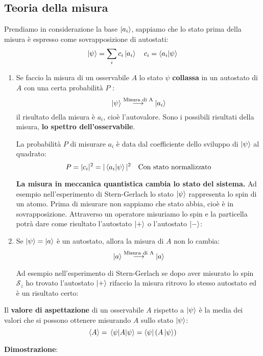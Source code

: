 \documentclass[a4paper]{article}
\begin{document}
\subsection{Teoria della misura}
Prendiamo in considerazione la base \( \ket{a_i} \), sappiamo che lo stato prima della
misura è espresso come sovrapposizione di autostati:
\[
  \ket{\psi} = \sum_i c_i \ket{a_i} \quad c_i = \braket{a_i}{\psi}
\] 
\begin{enumerate}
  \item Se faccio la misura di un osservabile \( A \) lo stato \( \psi \) \textbf{collassa}
    in un autostato di \( A \) con una certa probabilità \( P \) :
    \[
      \ket{\psi} \stackrel{\text{Misura di A}}{\longrightarrow} \ket{a_i}
    \] 
    il risultato della misura è \( a_i \), cioè l'autovalore. Sono i possibili
    risultati della misura, \textbf{lo spettro dell'osservabile}.

    \vspace{1em}
    \noindent
    La probabilità \( P \) di misurare \( a_i \) è data dal coefficiente dello sviluppo
    di \( \ket{\psi } \) al quadrato:
    \[
      P = |c_i|^2 = |\braket{a_i}{\psi}|^2 \quad \text{Con stato normalizzato}
    \]

    \vspace{1em}
    \noindent
    \textbf{La misura in meccanica quantistica cambia lo stato del sistema.} Ad
    esempio nell'esperimento di Stern-Gerlach lo stato \( \ket{\psi } \) rappresenta
    lo spin di un atomo. Prima di misurare non sappiamo che stato abbia, cioè è in
    sovrapposizione. Attraverso un operatore misuriamo lo spin e la particella
    potrà dare come risultato l'autostato \( \ket{+} \) o l'autostato \( \ket{-} \):
    \label{16-01-D1}

  \item Se \( \ket{\psi } = \ket{a} \) è un autostato, allora la misura di \( A \) non lo cambia:
    \[
      \ket{a} \stackrel{\text{Misura di A}}{\longrightarrow} \ket{a}
    \] 

    \vspace{1em}
    \noindent
    Ad esempio nell'esperimento di Stern-Gerlach se dopo aver misurato lo spin \( \mathcal{S}_z \) 
    ho trovato l'autostato \( \ket{+} \) rifaccio la misura ritrovo lo stesso autostato ed
    è un risultato certo:
    \label{16-01-D2}
\end{enumerate}

\begin{definition}
  Il \textbf{valore di aspettazione} di un osservabile \( A \) rispetto a \( \ket{\psi } \)
  è la media dei valori che si possono ottenere misurando \( A \) sullo stato 
  \( \ket{\psi } \):
  \[
    \expval{A} = \expval{A}{\psi} = \bra{\psi} \left( A \ket{\psi } \right) 
  \]
\end{definition}
\textbf{Dimostrazione}:
\end{document}
